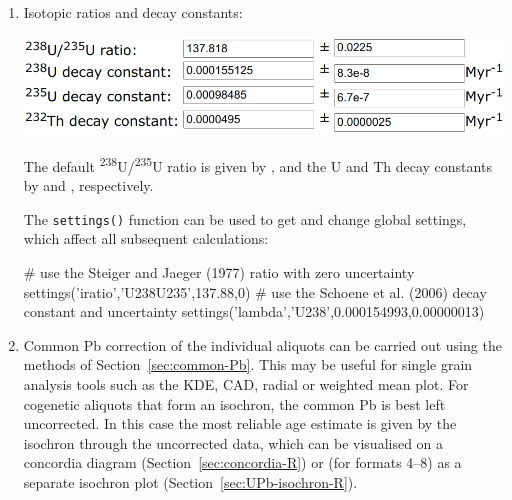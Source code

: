 \begin{refsection}
\begin{enumerate}
  \item\label{it:UPbLambdairatio} Isotopic ratios and decay constants:

\noindent\begin{minipage}[t]{.6\linewidth}
\strut\vspace*{-\baselineskip}\newline
\includegraphics[width=\linewidth]{../figures/UPbLambda.png}
\end{minipage}
\begin{minipage}[t]{.4\linewidth}
  The default \textsuperscript{238}U/\textsuperscript{235}U ratio is
  given by \citet{hiess2012}, and the U and Th decay constants by
  \citet{jaffey1971} and \citet{leroux1963}, respectively.
\end{minipage}

The \texttt{settings()} function can be used to get and change global
settings, which affect all subsequent calculations:

\begin{script}
# use the Steiger and Jaeger (1977) ratio with zero uncertainty
settings('iratio','U238U235',137.88,0)
# use the Schoene et al. (2006) decay constant and uncertainty
settings('lambda','U238',0.000154993,0.00000013) 
\end{script}

\item\label{it:common-Pb-concordia} Common Pb correction of the
  individual aliquots can be carried out using the methods of
  Section~\ref{sec:common-Pb}. This may be useful for single grain
  analysis tools such as the KDE, CAD, radial or weighted mean
  plot. For cogenetic aliquots that form an isochron, the common Pb is
  best left uncorrected. In this case the most reliable age estimate
  is given by the isochron through the uncorrected data, which can be
  visualised on a concordia diagram (Section~\ref{sec:concordia-R}) or
  (for formats 4--8) as a separate isochron plot
  (Section~\ref{sec:UPb-isochron-R}).\\


\end{enumerate}
\end{refsection}
